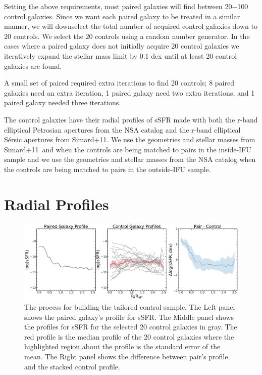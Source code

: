 \documentclass[iop,revtex4,twocolumn,apj,numberedappendix,appendixfloats]{emulateapj}
\newcommand{\simard}{Simard+11}
\begin{document}
Setting the above requirements, most paired galaxies will find between 20$-$100 control galaxies. Since we want each paired galaxy to be treated in a similar manner, we will downselect the total number of acquired control galaxies down to 20 controls. We select the 20 controls using a random number generator. In the cases where a paired galaxy does not initially acquire 20 control galaxies we iteratively expand the stellar mass limit by 0.1 dex until at least 20 control galaxies are found. 

A small set of paired required extra iterations to find 20 controls; 8 paired galaxies need an extra iteration, 1 paired galaxy need two extra iterations, and 1 paired galaxy needed three iterations.

The control galaxies have their radial profiles of sSFR made with both the r-band elliptical Petrosian apertures from the NSA catalog and the r-band elliptical S\'ersic apertures from \simard. We use the geometries and stellar masses from \simard\ and \citet{Mendel:2014} when the controls are being matched to pairs in the inside-IFU sample and we use the geometries and stellar masses from the NSA catalog when the controls are being matched to pairs in the outside-IFU sample. 

\section{Radial Profiles}\label{sec:radial}

\begin{figure}
\centering
\includegraphics[width=\linewidth]{fig/8083-12703.pdf}
\caption[Example of the difference profiles for the mass-redshift selected control sample.]{The process for building the tailored control sample. The Left panel shows the paired galaxy's profile for sSFR. The Middle panel shows the profiles for sSFR for the selected 20 control galaxies in gray. The red profile is the median profile of the 20 control galaxies where the highlighted region about the profile is the standard error of the mean. The Right panel shows the difference between pair's profile and the stacked control profile.}
\label{fig:dex}
\end{figure}
\end{document}
